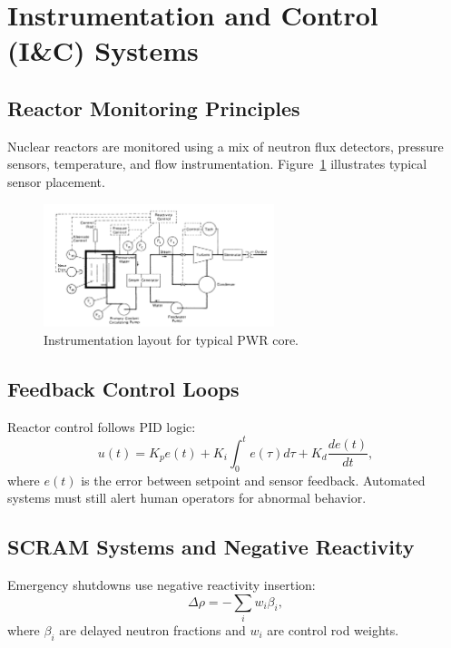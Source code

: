 \documentclass[12pt]{article}
\begin{document}
\section{Instrumentation and Control (I\&C) Systems}

\subsection{Reactor Monitoring Principles}
Nuclear reactors are monitored using a mix of neutron flux detectors, pressure sensors, temperature, and flow instrumentation. Figure~\ref{fig:coreinstrumentation} illustrates typical sensor placement.

\begin{figure}[H]
    \centering
    \includegraphics[width=0.6\textwidth]{instrumentation}
    \caption{Instrumentation layout for typical PWR core.}
    \label{fig:coreinstrumentation}
\end{figure}

\subsection{Feedback Control Loops}
Reactor control follows PID logic:
\begin{equation}
  u(t) = K_p e(t) + K_i \int_0^t e(\tau) d\tau + K_d \frac{de(t)}{dt},
  \label{eq:pid}
\end{equation}
where $e(t)$ is the error between setpoint and sensor feedback. Automated systems must still alert human operators for abnormal behavior.

\subsection{SCRAM Systems and Negative Reactivity}
Emergency shutdowns use negative reactivity insertion:
\begin{equation}
  \Delta\rho = -\sum_{i} w_i \beta_i,
  \label{eq:reactivity}
\end{equation}
where $\beta_i$ are delayed neutron fractions and $w_i$ are control rod weights.
\end{document}
